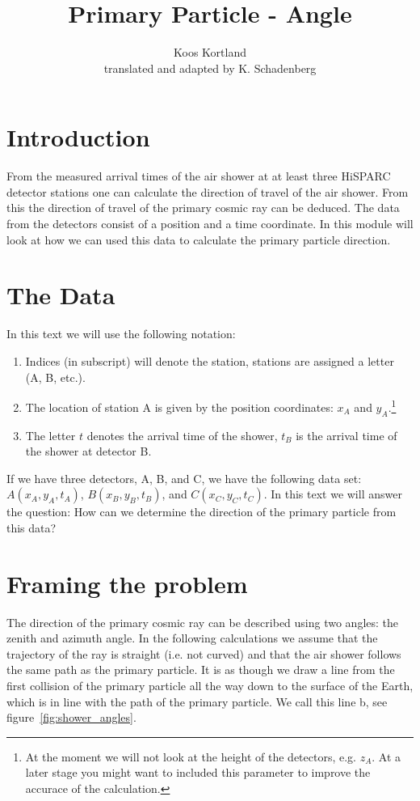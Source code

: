 \documentclass[12pt,a4paper]{article}
\author{Koos Kortland \\ translated and adapted by K. Schadenberg}
\date{}
\title{Primary Particle - Angle}
\numberwithin{equation}{section}
\numberwithin{figure}{section}
\numberwithin{table}{section}
\begin{document}
\maketitle

\section{Introduction}
From the measured arrival times of the air shower at at least three HiSPARC detector stations one can calculate the direction of travel of the air shower. From this the direction of travel of the primary cosmic ray can be deduced. The data from the detectors consist of a position and a time coordinate. In this module will look at how we can used this data to calculate the primary particle direction.

\section{The Data}
In this text we will use the following notation:
\begin{enumerate}[-]
\item Indices (in subscript) will denote the station, stations are assigned a letter (A, B, etc.).
\item The location of station A is given by the position coordinates: $x_A$ and $y_A$.\footnote{At the moment we will not look at the height of the detectors, e.g. $z_A$. At a later stage you might want to included this parameter to improve the accurace of the calculation.}
\item The letter $t$ denotes the arrival time of the shower, $t_B$ is the arrival time of the shower at detector B.
\end{enumerate}
If we have three detectors, A, B, and C, we have the following data set: $A(x_A, y_A, t_A)$, $B(x_B, y_B, t_B)$, and $C(x_C, y_C, t_C)$. In this text we will answer the question: How can we determine the direction of the primary particle from this data?

\section{Framing the problem}
The direction of the primary cosmic ray can be described using two angles: the zenith and azimuth angle. In the following calculations we assume that the trajectory of the ray is straight (i.e. not curved) and that the air shower follows the same path as the primary particle. It is as though we draw a line from the first collision of the primary particle all the way down to the surface of the Earth, which is in line with the path of the primary particle. We call this line b, see figure~\ref{fig:shower_angles}.
\end{document}
